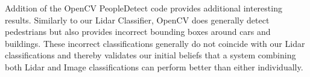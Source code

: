 \documentclass[10pt,twocolumn,letterpaper]{article}
\begin{document}
  Addition of the OpenCV PeopleDetect \cite{opencv} code provides additional interesting
  results. Similarly to our Lidar Classifier, OpenCV does generally detect
  pedestrians but also provides incorrect bounding boxes around cars and buildings.
  These incorrect classifications generally do not coincide with our Lidar
  classifications and thereby validates our initial beliefs that a system combining
  both Lidar and Image classifications can perform better than either individually.


{\small


}
\end{document}
